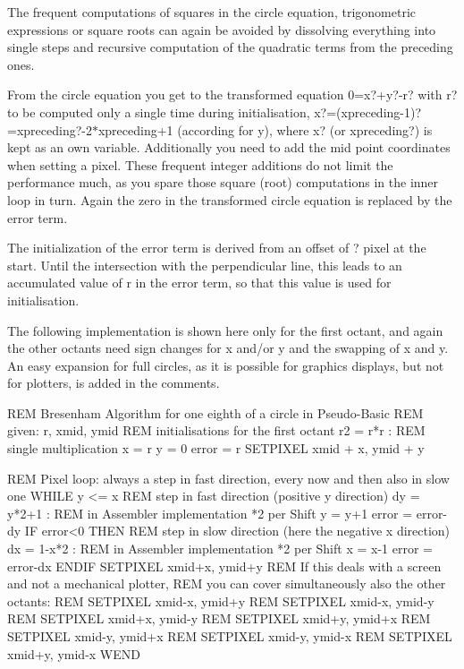 The frequent computations of squares in the circle equation, trigonometric expressions or square roots can again be avoided by dissolving everything into single steps and recursive computation of the quadratic terms from the preceding ones.

From the circle equation you get to the transformed equation 0=x?+y?-\/r? with r? to be computed only a single time during initialisation, x?=(xpreceding-\/1)?=xpreceding?-\/2$\ast$xpreceding+1 (according for y), where x? (or xpreceding?) is kept as an own variable. Additionally you need to add the mid point coordinates when setting a pixel. These frequent integer additions do not limit the performance much, as you spare those square (root) computations in the inner loop in turn. Again the zero in the transformed circle equation is replaced by the error term.

The initialization of the error term is derived from an offset of ? pixel at the start. Until the intersection with the perpendicular line, this leads to an accumulated value of r in the error term, so that this value is used for initialisation.

The following implementation is shown here only for the first octant, and again the other octants need sign changes for x and/or y and the swapping of x and y. An easy expansion for full circles, as it is possible for graphics displays, but not for plotters, is added in the comments.

\begin{DoxyVerb}REM Bresenham Algorithm for one eighth of a circle in Pseudo-Basic
REM given: r, xmid, ymid
REM initialisations for the first octant
r2 = r*r : REM single multiplication
x = r
y = 0
error = r
SETPIXEL xmid + x, ymid + y

REM Pixel loop: always a step in fast direction, every now and then also in slow one
WHILE y <= x
   REM step in fast direction (positive y direction)
   dy = y*2+1 : REM in Assembler implementation *2 per Shift
   y = y+1
   error = error-dy
   IF error<0 THEN
      REM step in slow direction (here the negative x direction)
      dx = 1-x*2 : REM in Assembler implementation *2 per Shift
      x = x-1
      error = error-dx
      ENDIF
   SETPIXEL  xmid+x, ymid+y
   REM If this deals with a screen and not a mechanical plotter,
   REM you can cover simultaneously also the other octants:
   REM SETPIXEL xmid-x, ymid+y
   REM SETPIXEL xmid-x, ymid-y
   REM SETPIXEL xmid+x, ymid-y
   REM SETPIXEL xmid+y, ymid+x
   REM SETPIXEL xmid-y, ymid+x
   REM SETPIXEL xmid-y, ymid-x
   REM SETPIXEL xmid+y, ymid-x
   WEND
\end{DoxyVerb}


